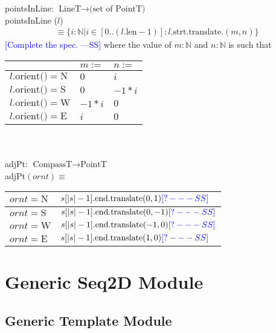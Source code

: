 \documentclass[12pt]{article}
\newcommand{\authornote}[3]{\textcolor{#1}{[#3 ---#2]}}
\newcommand{\authornote}[3]{}
\newcommand{\wss}[1]{\authornote{blue}{SS}{#1}}
\begin{document}
pointsInLine: $\mbox{LineT} \rightarrow \mbox{(set of PointT)}$\\

\noindent pointsInLine ($l$) 
\begin{multline*}
\equiv \{ i: \mathbb{N} | i \in [0
  .. (l.\mbox{len} - 1)] : l.\mbox{strt}.\mbox{translate}.(m,n)\}
\end{multline*} \wss{Complete the spec.}
where the value of $m: \mathbb{N}$ and $n: \mathbb{N}$ is such that \\

\begin{tabular}{|l|l|l|}
\hline
& $m :=  $& $n := $  \\
\hline
$l.\mbox{orient()} = \mbox{N}$ & $0 $& $i$  \\
\hline
$l.\mbox{orient()}  = \mbox{S}$ & $0$ & $-1*i$ \\
\hline
$l.\mbox{orient()}  = \mbox{W}$ & $ -1*i$ & $ 0$ \\
\hline
$l.\mbox{orient()} = \mbox{E}$ & $ i$ & $ 0$ \\
\hline
\end{tabular}
\\ \\

\noindent adjPt: $\mbox{CompassT} \rightarrow \mbox{PointT}$\\
adjPt$(ornt) \equiv$

\medskip

\begin{tabular}{|l|l|}
\hline
$ornt = \mbox{N}$ & $s[|s|-1].\mbox{end}.\mbox{translate}(0,1)\wss{?}$\\
\hline
$ornt = \mbox{S}$ & $s[|s|-1].\mbox{end}.\mbox{translate}(0,-1)\wss{?}$\\
\hline
$ornt = \mbox{W}$ & $s[|s|-1].\mbox{end}.\mbox{translate}(-1,0)\wss{?}$\\
\hline
$ornt = \mbox{E}$ & $s[|s|-1].\mbox{end}.\mbox{translate}(1,0)\wss{?}$\\
\hline
\end{tabular}

\newpage

\section* {Generic Seq2D Module}

\subsection* {Generic Template Module}
\end{document}
